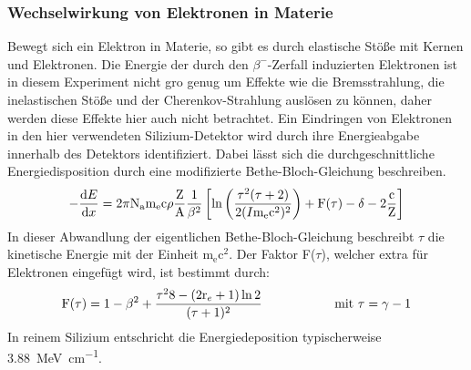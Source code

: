 \subsubsection{Wechselwirkung von Elektronen in Materie}
Bewegt sich ein Elektron in Materie, so gibt es durch elastische Stöße mit Kernen und
Elektronen. Die Energie der durch den $\beta^{-}$-Zerfall induzierten Elektronen
ist in diesem Experiment nicht gro genug um Effekte wie die Bremsstrahlung, die
inelastischen Stöße und der Cherenkov-Strahlung auslösen zu können, daher werden
diese Effekte hier auch nicht betrachtet.
Ein Eindringen von Elektronen in den hier verwendeten Silizium-Detektor wird durch
ihre Energieabgabe innerhalb des Detektors identifiziert. Dabei lässt sich die
durchgeschnittliche Energiedisposition durch eine modifizierte Bethe-Bloch-Gleichung
beschreiben.
\begin{equation}
  -\frac{\text{d}E}{\text{d}x} = 2\pi \text{N}_\text{a} \text{m}_\text{e} \text{c}\rho \frac{\text{Z}}{\text{A}}\frac{1}{\beta^2}\left[\text{ln}\left(\frac{\tau^2(\tau + 2)}{2(I\/\text{m}_\text{e}\text{c}^2)^2}\right) + \text{F}(\tau) - \delta - 2\frac{\text{c}}{\text{Z}}\right]
\end{equation}
In dieser Abwandlung der eigentlichen Bethe-Bloch-Gleichung beschreibt $\tau$ die
kinetische Energie mit der Einheit m$_\text{e}$c$^2$. Der Faktor F($\tau$), welcher
extra für Elektronen eingefügt wird, ist bestimmt durch:
\begin{equation}
  \text{F}(\tau) = 1 - \beta^2 + \frac{\tau^2\/8 - (2\text{r}_e + 1) \ln2}{(\tau + 1)^2} \hspace{2cm}\text{mit } \tau = \gamma - 1
\end{equation}
In reinem Silizium entschricht die Energiedeposition typischerweise
\SI{3.88}{\mega\electronvolt\per\centi\meter}.

